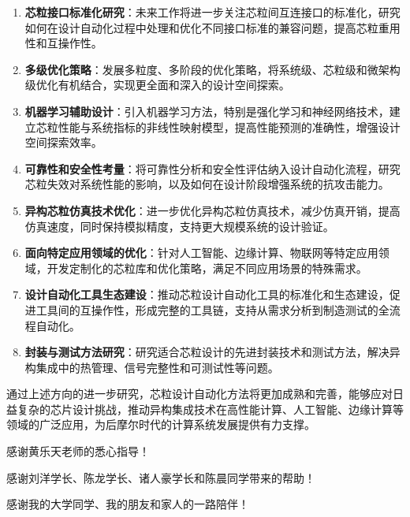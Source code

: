 \documentclass[bachelor]{thesis-uestc}
\begin{document}
\begin{enumerate}
    \item \textbf{芯粒接口标准化研究}：未来工作将进一步关注芯粒间互连接口的标准化，研究如何在设计自动化过程中处理和优化不同接口标准的兼容问题，提高芯粒重用性和互操作性。

    \item \textbf{多级优化策略}：发展多粒度、多阶段的优化策略，将系统级、芯粒级和微架构级优化有机结合，实现更全面和深入的设计空间探索。

    \item \textbf{机器学习辅助设计}：引入机器学习方法，特别是强化学习和神经网络技术，建立芯粒性能与系统指标的非线性映射模型，提高性能预测的准确性，增强设计空间探索效率。

    \item \textbf{可靠性和安全性考量}：将可靠性分析和安全性评估纳入设计自动化流程，研究芯粒失效对系统性能的影响，以及如何在设计阶段增强系统的抗攻击能力。

    \item \textbf{异构芯粒仿真技术优化}：进一步优化异构芯粒仿真技术，减少仿真开销，提高仿真速度，同时保持模拟精度，支持更大规模系统的设计验证。

    \item \textbf{面向特定应用领域的优化}：针对人工智能、边缘计算、物联网等特定应用领域，开发定制化的芯粒库和优化策略，满足不同应用场景的特殊需求。

    \item \textbf{设计自动化工具生态建设}：推动芯粒设计自动化工具的标准化和生态建设，促进工具间的互操作性，形成完整的工具链，支持从需求分析到制造测试的全流程自动化。

    \item \textbf{封装与测试方法研究}：研究适合芯粒设计的先进封装技术和测试方法，解决异构集成中的热管理、信号完整性和可测试性等问题。
\end{enumerate}

通过上述方向的进一步研究，芯粒设计自动化方法将更加成熟和完善，能够应对日益复杂的芯片设计挑战，推动异构集成技术在高性能计算、人工智能、边缘计算等领域的广泛应用，为后摩尔时代的计算系统发展提供有力支撑。

\thesisacknowledgement
感谢黄乐天老师的悉心指导！


感谢刘洋学长、陈龙学长、诸人豪学长和陈晨同学带来的帮助！


感谢我的大学同学、我的朋友和家人的一路陪伴！


\thesisappendix



\end{document}

